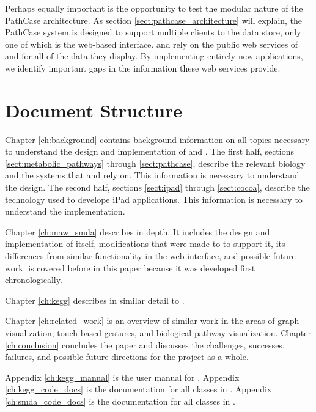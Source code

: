 Perhaps equally important is the opportunity to test the modular nature of the
PathCase architecture. As section \ref{sect:pathcase_architecture} will explain,
the PathCase system is designed to support multiple clients to the data store,
only one of which is the web-based interface. \keggapp and \mawapp rely on the
public web services of \pathcasekegg and \pathcasemaw for all of the data they
display. By implementing entirely new applications, we identify important gaps
in the information these web services provide.

\section{Document Structure}

Chapter \ref{ch:background} contains background information on all topics
necessary to understand the design and implementation of \keggapp and \mawapp.
The first half, sections \ref{sect:metabolic_pathways} through
\ref{sect:pathcase}, describe the relevant biology and the systems that \keggapp
and \mawapp rely on. This information is necessary to understand the design. The
second half, sections \ref{sect:ipad} through \ref{sect:cocoa}, describe the
technology used to develope iPad applications. This information is necessary to
understand the implementation.

Chapter \ref{ch:maw_smda} describes \mawapp in depth. It includes the design and
implementation of \mawapp itself, modifications that were made to \pathcasemaw
to support it, its differences from similar functionality in the \pathcasemaw
web interface, and possible future work. \mawapp is covered before \keggapp
in this paper because it was developed first chronologically.

Chapter \ref{ch:kegg} describes \keggapp in similar detail to \mawapp.

Chapter \ref{ch:related_work} is an overview of similar work in the areas of
graph visualization, touch-based gestures, and biological pathway visualization.
Chapter \ref{ch:conclusion} concludes the paper and discusses the challenges,
successes, failures, and possible future directions for the project as a whole.

Appendix \ref{ch:kegg_manual} is the user manual for \keggapp. Appendix
\ref{ch:kegg_code_docs} is the documentation for all classes in \mawapp.
Appendix \ref{ch:smda_code_docs} is the documentation for all classes in
\keggapp.
